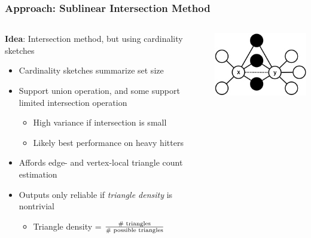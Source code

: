 \documentclass{beamer}
\begin{document}
\begin{frame}
\frametitle{Approach: Sublinear Intersection Method}


\begin{columns}
\begin{column}{0.65\textwidth}
	\textbf{Idea}: Intersection method, but using cardinality sketches
	\begin{itemize}
		\item Cardinality sketches summarize set size
		\item Support union operation, and some support limited intersection operation
		\begin{itemize}
			\item High variance if intersection is small
			\item Likely best performance on heavy hitters
		\end{itemize}
		\item Affords edge- and vertex-local triangle count estimation
		\item Outputs only reliable if \emph{triangle density} is nontrivial
		\begin{itemize}
			\item Triangle density = $\frac{\textnormal{\# triangles}}{\textnormal{\# possible triangles}}$
		\end{itemize}
	\end{itemize}
\end{column}
\begin{column}{0.35\textwidth}  %
	\begin{center}
		\includegraphics[width=1.0\textwidth]{edge_local}
	\end{center}
	\begin{center}

\end{center}
\end{column}
\end{columns}
\end{frame}
\end{document}
